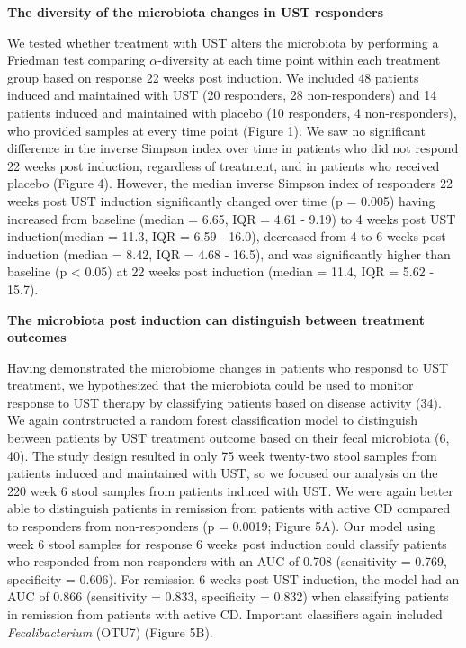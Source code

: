 \documentclass[11pt,]{article}
\begin{document}
\textbf{The diversity of the microbiota changes in UST responders}

We tested whether treatment with UST alters the microbiota by performing
a Friedman test comparing \({\alpha}\)-diversity at each time point
within each treatment group based on response 22 weeks post induction.
We included 48 patients induced and maintained with UST (20 responders,
28 non-responders) and 14 patients induced and maintained with placebo
(10 responders, 4 non-responders), who provided samples at every time
point (Figure 1). We saw no significant difference in the inverse
Simpson index over time in patients who did not respond 22 weeks post
induction, regardless of treatment, and in patients who received placebo
(Figure 4). However, the median inverse Simpson index of responders 22
weeks post UST induction significantly changed over time (p = 0.005)
having increased from baseline (median = 6.65, IQR = 4.61 - 9.19) to 4
weeks post UST induction(median = 11.3, IQR = 6.59 - 16.0), decreased
from 4 to 6 weeks post induction (median = 8.42, IQR = 4.68 - 16.5), and
was significantly higher than baseline (p \textless{} 0.05) at 22 weeks
post induction (median = 11.4, IQR = 5.62 - 15.7).

\textbf{The microbiota post induction can distinguish between treatment
outcomes}

Having demonstrated the microbiome changes in patients who responsd to
UST treatment, we hypothesized that the microbiota could be used to
monitor response to UST therapy by classifying patients based on disease
activity (34). We again contrstructed a random forest classification
model to distinguish between patients by UST treatment outcome based on
their fecal microbiota (6, 40). The study design resulted in only 75
week twenty-two stool samples from patients induced and maintained with
UST, so we focused our analysis on the 220 week 6 stool samples from
patients induced with UST. We were again better able to distinguish
patients in remission from patients with active CD compared to
responders from non-responders (p = 0.0019; Figure 5A). Our model using
week 6 stool samples for response 6 weeks post induction could classify
patients who responded from non-responders with an AUC of 0.708
(sensitivity = 0.769, specificity = 0.606). For remission 6 weeks post
UST induction, the model had an AUC of 0.866 (sensitivity = 0.833,
specificity = 0.832) when classifying patients in remission from
patients with active CD. Important classifiers again included
\emph{Fecalibacterium} (OTU7) (Figure 5B).
\end{document}
